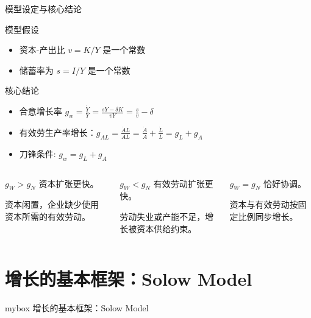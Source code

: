 \documentclass[aspectratio=32]{beamer}
\begin{document}
\begin{frame}{模型设定与核心结论}
\begin{block}{模型假设}
\begin{itemize}
  \item 资本-产出比 $v=K/Y$ 是一个常数
  \item 储蓄率为 $s=I/Y$ 是一个常数
\end{itemize}
\end{block}

\begin{block}{核心结论}
\begin{itemize}
  \item 合意增长率 $g_w=\frac{\dot Y}{Y}=\frac{sY-\delta K}{vY}=\frac{s}{v}-\delta$
  \item 有效劳生产率增长：$g_{AL}=\frac{\dot AL}{AL}=\frac{\dot A}{A}+\frac{\dot L}{L}=g_L+g_A$
  \item 刀锋条件: $g_w=g_L+g_A$
\end{itemize}
\end{block}

\begin{columns}[T]
\begin{block}{$g_W>g_N$}
资本扩张更快。\par\vspace{0.1cm}
资本闲置，企业缺少使用资本所需的有效劳动。
\end{block}
\begin{block}{$g_W<g_N$}
有效劳动扩张更快。\par\vspace{0.1cm}
劳动失业或产能不足，增长被资本供给约束。
\end{block}
\begin{block}{$g_W=g_N$}
恰好协调。\par\vspace{0.1cm}
资本与有效劳动按固定比例同步增长。
\end{block}
\end{columns}
\end{frame}

\section{增长的基本框架：Solow Model}
\begin{frame}
\begin{center}
    \begin{minipage}{1\textwidth}
		\begin{beamercolorbox}[wd=0.7\textwidth, rounded=true, shadow=true]{mybox}
			\LARGE \centering 增长的基本框架：Solow Model
		\end{beamercolorbox}
    \end{minipage}
\end{center} 
\end{frame}
\end{document}
